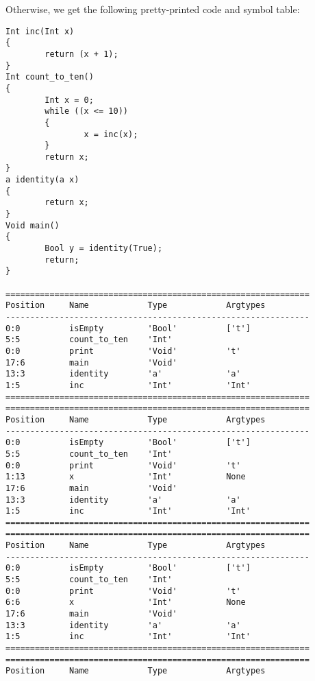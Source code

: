 \documentclass[a4paper]{article}
\begin{document}
Otherwise, we get the following pretty-printed code and symbol table: 
\begin{verbatim}
Int inc(Int x)
{
        return (x + 1);
}
Int count_to_ten()
{
        Int x = 0;
        while ((x <= 10))
        {
                x = inc(x);
        }
        return x;
}
a identity(a x)
{
        return x;
}
Void main()
{
        Bool y = identity(True);
        return;
}

==============================================================
Position     Name            Type            Argtypes            
--------------------------------------------------------------
0:0          isEmpty         'Bool'          ['t']               
5:5          count_to_ten    'Int'                               
0:0          print           'Void'          't'                 
17:6         main            'Void'                              
13:3         identity        'a'             'a'                 
1:5          inc             'Int'           'Int'               
==============================================================
==============================================================
Position     Name            Type            Argtypes            
--------------------------------------------------------------
0:0          isEmpty         'Bool'          ['t']               
5:5          count_to_ten    'Int'                               
0:0          print           'Void'          't'                 
1:13         x               'Int'           None                
17:6         main            'Void'                              
13:3         identity        'a'             'a'                 
1:5          inc             'Int'           'Int'               
==============================================================
==============================================================
Position     Name            Type            Argtypes            
--------------------------------------------------------------
0:0          isEmpty         'Bool'          ['t']               
5:5          count_to_ten    'Int'                               
0:0          print           'Void'          't'                 
6:6          x               'Int'           None                
17:6         main            'Void'                              
13:3         identity        'a'             'a'                 
1:5          inc             'Int'           'Int'               
==============================================================
==============================================================
Position     Name            Type            Argtypes            

\end{verbatim}
\end{document}
